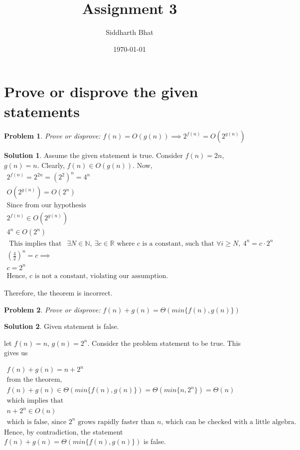 \documentclass[12pt]{article}
\newtheorem*{problem}{Problem}
\theoremstyle{definition}
\newtheorem*{solution}{Solution}
\begin{document}
\title{Assignment 3}
\author{Siddharth Bhat}
\date{\today}
\maketitle

\section{Prove or disprove the given statements}
\begin{problem}
Prove or disprove: $f(n) = O(g(n)) \implies 2^{f(n)} = O(2^{g(n)})$
\end{problem}
\begin{solution}
	Assume the given statement is true. 
	Consider $f(n) = 2n$, $g(n) = n$. Clearly, $f(n) \in O(g(n))$.
	Now,
	\begin{gather*}
		2^{f(n)} = 2^{2n}= (2^2)^n = 4^n \\
		O(2^{g(n)}) = O(2^n) \\
		\text{Since from our hypothesis} \\
		2^{f(n)} \in O(2^{g(n)}) \\
		4^n \in O(2^n) \\
		\text{ This implies that } \ \ \exists N \in \mathbb N,\ \exists c \in \mathbb R \text{ where $c$ is a constant, such that }
		\forall i \geq N, \ 4^n = c \cdot 2^n \\
		\left ( \frac{4}{2} \right ) ^n = c \implies \\
		c = 2^n \\
		\text{Hence, $c$ is not a constant, violating our assumption.}
	\end{gather*}
	
	Therefore, the theorem is incorrect.
\end{solution}

\begin{problem}
Prove or disprove: $f(n) + g(n) = \Theta(min \{ f(n), g(n) \})$
\end{problem}
\begin{solution}
	Given statement is false.
	
	let $f(n) = n$, $g(n) = 2^n$. Consider the problem statement to be
	true. This gives us
	
	\begin{gather*}
		f(n) + g(n) = n + 2^n \\
		\text{from the theorem, } \\
		f(n) + g(n) \in \Theta(min \{ f(n), g(n) \}) = \Theta(min \{n, 2^n \}) = \Theta(n) \\
		\text{which implies that} \\
		n + 2^n \in O(n) \\
		\text{which is false, since $2^n$ grows rapidly faster than $n$, which can
		be checked with a little algebra.}
	\end{gather*}
	Hence, by contradiction, the statement $f(n) + g(n) = \Theta(min \{ f(n), g(n) \})$ is false.
\end{solution}
\end{document}
